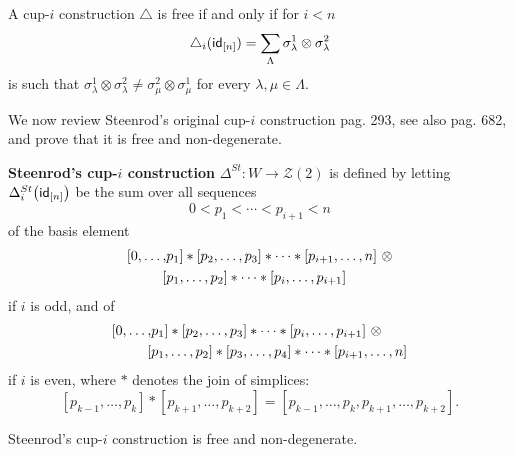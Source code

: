 \begin{lemma} \label{lemma: free and non-deg in coproduct}
	A cup-$i$ construction $\triangle$ is free if and only if for $i < n$
	\[
	\triangle_i (\mathsf{id}_{[n]}) = \sum_{\Lambda} \sigma^1_\lambda \otimes \sigma^2_\lambda
	\]
	is such that $\sigma^1_\lambda \otimes \sigma^2_\lambda \neq \sigma^2_\mu \otimes \sigma^1_\mu$ for every $\lambda, \mu \in \Lambda$.
\end{lemma}

We now review Steenrod's original cup-$i$ construction \cite{steenrod1947products} pag.  293, see also \cite{mcclure2003multivariable} pag. 682, and prove that it is free and non-degenerate.

\begin{definition}
	\textbf{Steenrod's cup-$i$ construction} $\Delta^{St} : W \to \mathcal{Z}(2)$ is defined by letting $\Delta_i^{St} \big( \mathsf{id}_{[n]} \big)$ be the sum over all sequences
	\[
	0 < p_1 < \cdots < p_{i+1} < n
	\]
	of the basis element
	\begin{equation} \label{equation: steenrod original i odd}
	\begin{split}
	[ 0, \dots, &{p_1} ] \ast [ {p_2}, \dots, {p_3} ] \ast \cdots \ast [ {p_{i+1}}, \dots, n ]\ \otimes \\
	[ &{p_1}, \dots, {p_2} ] \ast \cdots \ast [ {p_{i}}, \dots, {p_{i+1}} ]
	\end{split}
	\end{equation}
	if $i$ is odd, and of
	\begin{equation} \label{equation: steenrod original i even}
	\begin{split}
	[ 0, \dots, &{p_1} ] \ast [ {p_2}, \dots, {p_3} ] \ast \cdots \ast [ {p_{i}}, \dots, {p_{i+1}} ]\ \otimes \\
	[ &{p_1}, \dots, {p_2} ] \ast [ {p_3}, \dots, {p_4} ] \ast \cdots \ast [ {p_{i+1}}, \dots, n ]
	\end{split}
	\end{equation}
	if $i$ is even, where $\ast$ denotes the join of simplices:
	\[
	[{p_{k-1}}, \dots, {p_{k}} ] \ast [ {p_{k+1}}, \dots, p_{k+2}] = [{p_{k-1}}, \dots, p_k, p_{k+1}, \dots, p_{k+2}].
	\]
\end{definition}

\begin{proposition}
	Steenrod's cup-$i$ construction is free and non-degenerate.
\end{proposition}

